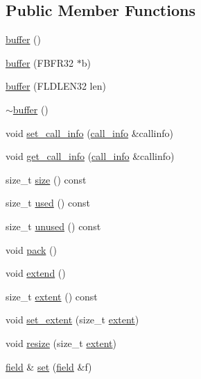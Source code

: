 \subsection*{Public Member Functions}
\begin{DoxyCompactItemize}
\item 
\hyperlink{classatmi_1_1buffer_ab5a434d367c856f9b1b7c831b98ff0d3}{buffer} ()
\item 
\hyperlink{classatmi_1_1buffer_a5a2836413da6d30d25afa2ea242cd90d}{buffer} (F\+B\+F\+R32 $\ast$b)
\item 
\hyperlink{classatmi_1_1buffer_ae2bc183e6b0909b8155dcfa17686a574}{buffer} (F\+L\+D\+L\+E\+N32 len)
\item 
\hyperlink{classatmi_1_1buffer_aa58097eacc94f1f5cc5e99b434ec7135}{$\sim$buffer} ()
\item 
void \hyperlink{classatmi_1_1buffer_a51d14f5d63ae22666ce0d5dc46e91728}{set\+\_\+call\+\_\+info} (\hyperlink{classatmi_1_1call__info}{call\+\_\+info} \&callinfo)
\item 
void \hyperlink{classatmi_1_1buffer_a84a4bd3782f9ffafa962a2393484b0b7}{get\+\_\+call\+\_\+info} (\hyperlink{classatmi_1_1call__info}{call\+\_\+info} \&callinfo)
\item 
size\+\_\+t \hyperlink{classatmi_1_1buffer_a8228f64305e566b8133e8ee746c6d2bb}{size} () const 
\item 
size\+\_\+t \hyperlink{classatmi_1_1buffer_a4ab660c5750cb0793eb99782fd36c0fa}{used} () const 
\item 
size\+\_\+t \hyperlink{classatmi_1_1buffer_a30b054d9d60238f34463d4bcd5ac3e16}{unused} () const 
\item 
void \hyperlink{classatmi_1_1buffer_ab9294b1a1e54e35717db40cb6bbb6de1}{pack} ()
\item 
void \hyperlink{classatmi_1_1buffer_a853e2a0585dda4e23ffa04297b824afb}{extend} ()
\item 
size\+\_\+t \hyperlink{classatmi_1_1buffer_af35cd2e5a5cdd7499fb396dbdbe3f61a}{extent} () const 
\item 
void \hyperlink{classatmi_1_1buffer_a10150940e8fc679b6bdc52bc02e6d016}{set\+\_\+extent} (size\+\_\+t \hyperlink{classatmi_1_1buffer_af35cd2e5a5cdd7499fb396dbdbe3f61a}{extent})
\item 
void \hyperlink{classatmi_1_1buffer_a95d13597c2f28bfc8ee5dac4db131179}{resize} (size\+\_\+t \hyperlink{classatmi_1_1buffer_af35cd2e5a5cdd7499fb396dbdbe3f61a}{extent})
\item 
\hyperlink{classatmi_1_1field}{field} \& \hyperlink{classatmi_1_1buffer_a1fe98844cb17328390b3d4e658bd6903}{set} (\hyperlink{classatmi_1_1field}{field} \&f)

\end{DoxyCompactItemize}

